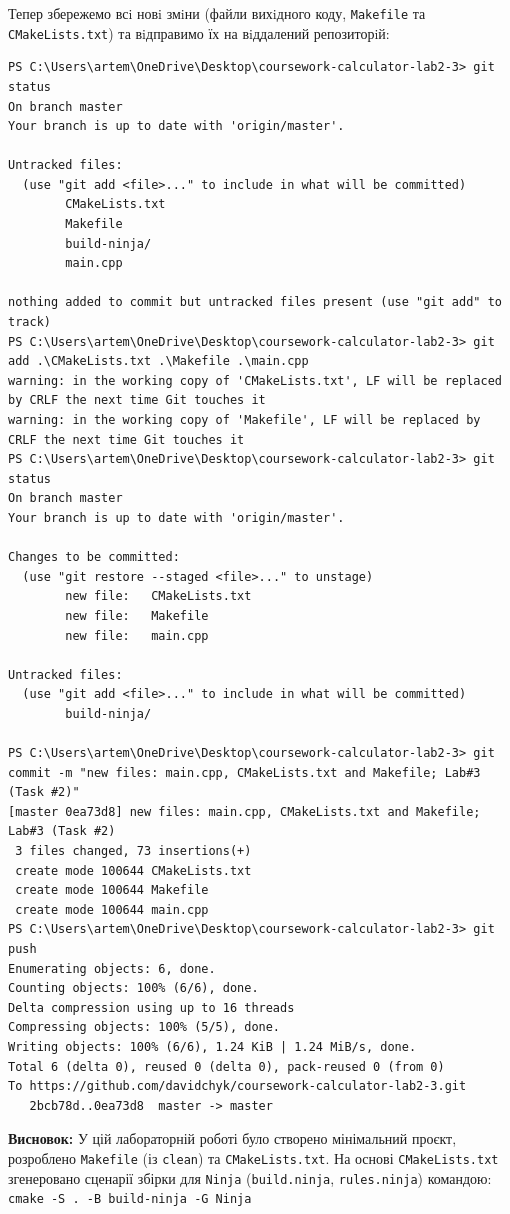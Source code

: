 \documentclass[a4paper,12pt]{article}
\begin{document}
    Тепер збережемо всi новi змiни (файли вихiдного коду, \texttt{Makefile} та \texttt{CMakeLists.txt}) та
вiдправимо їх на вiддалений репозиторiй:

    \begin{verbatim}
PS C:\Users\artem\OneDrive\Desktop\coursework-calculator-lab2-3> git status
On branch master
Your branch is up to date with 'origin/master'.

Untracked files:
  (use "git add <file>..." to include in what will be committed)
        CMakeLists.txt
        Makefile
        build-ninja/
        main.cpp

nothing added to commit but untracked files present (use "git add" to track)
PS C:\Users\artem\OneDrive\Desktop\coursework-calculator-lab2-3> git add .\CMakeLists.txt .\Makefile .\main.cpp
warning: in the working copy of 'CMakeLists.txt', LF will be replaced by CRLF the next time Git touches it
warning: in the working copy of 'Makefile', LF will be replaced by CRLF the next time Git touches it
PS C:\Users\artem\OneDrive\Desktop\coursework-calculator-lab2-3> git status
On branch master
Your branch is up to date with 'origin/master'.

Changes to be committed:
  (use "git restore --staged <file>..." to unstage)
        new file:   CMakeLists.txt
        new file:   Makefile
        new file:   main.cpp

Untracked files:
  (use "git add <file>..." to include in what will be committed)
        build-ninja/

PS C:\Users\artem\OneDrive\Desktop\coursework-calculator-lab2-3> git commit -m "new files: main.cpp, CMakeLists.txt and Makefile; Lab#3 (Task #2)"
[master 0ea73d8] new files: main.cpp, CMakeLists.txt and Makefile; Lab#3 (Task #2)
 3 files changed, 73 insertions(+)
 create mode 100644 CMakeLists.txt
 create mode 100644 Makefile
 create mode 100644 main.cpp
PS C:\Users\artem\OneDrive\Desktop\coursework-calculator-lab2-3> git push
Enumerating objects: 6, done.
Counting objects: 100% (6/6), done.
Delta compression using up to 16 threads
Compressing objects: 100% (5/5), done.
Writing objects: 100% (6/6), 1.24 KiB | 1.24 MiB/s, done.
Total 6 (delta 0), reused 0 (delta 0), pack-reused 0 (from 0)
To https://github.com/davidchyk/coursework-calculator-lab2-3.git
   2bcb78d..0ea73d8  master -> master
    \end{verbatim}

    \textbf{Висновок:} У цій лабораторній роботі було створено мінімальний проєкт,
розроблено \texttt{Makefile} (із \texttt{clean}) та \texttt{CMakeLists.txt}. На основі
\texttt{CMakeLists.txt} згенеровано сценарії збірки для \texttt{Ninja}
(\texttt{build.ninja}, \texttt{rules.ninja}) командою:
\texttt{cmake -S . -B build-ninja -G Ninja}
\end{document}
